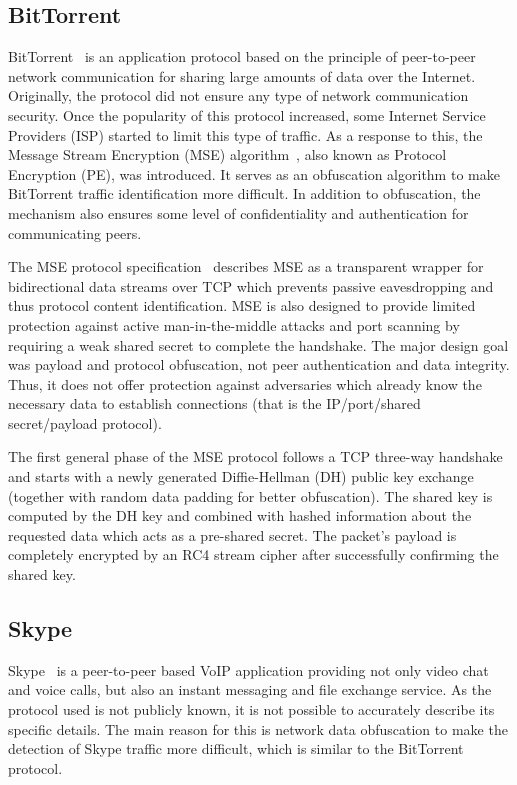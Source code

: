 
\subsection{BitTorrent}
BitTorrent~\cite{bittorrent-specification} is an application protocol based on the principle of peer-to-peer network communication for sharing large amounts of data over the Internet. Originally, the protocol did not ensure any type of network communication security. Once the popularity of this protocol increased, some Internet Service Providers (ISP) started to limit this type of traffic. As a response to this, the Message Stream Encryption (MSE) algorithm~\cite{mse-specification}, also known as Protocol Encryption (PE), was introduced. It serves as an obfuscation algorithm to make BitTorrent traffic identification more difficult. In addition to obfuscation, the mechanism also ensures some level of confidentiality and authentication for communicating peers.

The MSE protocol specification~\cite{mse-specification} describes MSE as a transparent wrapper for bidirectional data streams over TCP which prevents passive eavesdropping and thus protocol content identification. MSE is also designed to provide limited protection against active man-in-the-middle attacks and port scanning by requiring a weak shared secret to complete the handshake. The major design goal was payload and protocol obfuscation, not peer authentication and data integrity. Thus, it does not offer protection against adversaries which already know the necessary data to establish connections (that is the IP/port/shared secret/payload protocol).

The first general phase of the MSE protocol follows a TCP three-way handshake and starts with a newly generated Diffie-Hellman (DH) public key exchange (together with random data padding for better obfuscation). The shared key is computed by the DH key and combined with hashed information about the requested data which acts as a pre-shared secret. The packet's payload is completely encrypted by an RC4 stream cipher after successfully confirming the shared key.


\subsection{Skype}
Skype~\cite{skype-web} is a peer-to-peer based VoIP application providing not only video chat and voice calls, but also an instant messaging and file exchange service. As the protocol used is not publicly known, it is not possible to accurately describe its specific details. The main reason for this is network data obfuscation to make the detection of Skype traffic more difficult, which is similar to the BitTorrent protocol.


